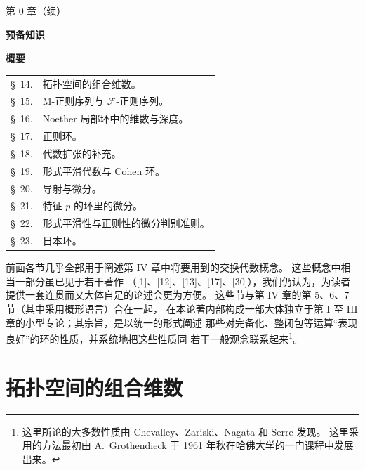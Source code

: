 \clearpage
\thispagestyle{plain}
\label{chapter:0IV1-fr}

\begin{center}
{\large 第 0 章（续）\footnotemark\par}
\vspace{1.5em}
{\Large\bfseries 预备知识\par}
\vspace{2em}
{\large\bfseries 概要\par}
\end{center}


\begin{center}
\begin{tabular}{@{}r l@{}}
\S~14. & 拓扑空间的组合维数。\\
\S~15. & M-正则序列与 $\mathscr F$-正则序列。\\
\S~16. & Noether 局部环中的维数与深度。\\
\S~17. & 正则环。\\
\S~18. & 代数扩张的补充。\\
\S~19. & 形式平滑代数与 Cohen 环。\\
\S~20. & 导射与微分。\\
\S~21. & 特征 $p$ 的环里的微分。\\
\S~22. & 形式平滑性与正则性的微分判别准则。\\
\S~23. & 日本环。
\end{tabular}
\end{center}

前面各节几乎全部用于阐述第 IV 章中将要用到的交换代数概念。
这些概念中相当一部分虽已见于若干著作
（[1]、[12]、[13]、[17]、[30]），我们仍认为，为读者提供一套连贯而又大体自足的论述会更为方便。
这些节与第 IV 章的第 5、6、7 节（其中采用概形语言）合在一起，
在本论著内部构成一部大体独立于第 I 至 III 章的小型专论；其宗旨，是以统一的形式阐述
那些对完备化、整闭包等运算“表现良好”的环的性质，并系统地把这些性质同
若干一般观念联系起来\footnote{这里所论的大多数性质由 Chevalley、Zariski、Nagata 和 Serre 发现。
这里采用的方法最初由 A.~Grothendieck 于 1961 年秋在哈佛大学的一门课程中发展出来。}。

\setcounter{section}{13}
\section{拓扑空间的组合维数}
\label{section:0.14-fr}

